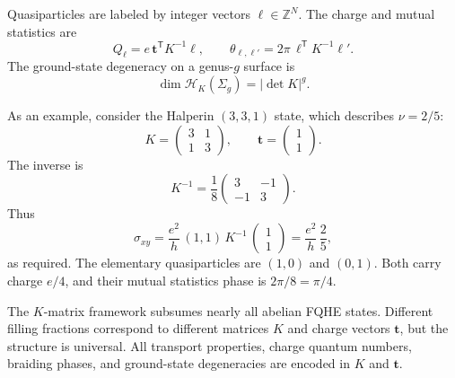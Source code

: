 Quasiparticles are labeled by integer vectors $\boldsymbol{\ell}\in\mathbb{Z}^N$. The charge and mutual statistics are
\begin{equation}
  Q_{\boldsymbol{\ell}}
  =
  e\,\mathbf{t}^{\mathsf{T}}K^{-1}\boldsymbol{\ell},
  \qquad
  \theta_{\boldsymbol{\ell},\boldsymbol{\ell}'}
  =
  2\pi\,\boldsymbol{\ell}^{\mathsf{T}}K^{-1}\boldsymbol{\ell}'.
  \label{eq:fqhe-k-charge-statistics}
\end{equation}
The ground-state degeneracy on a genus-$g$ surface is
\begin{equation}
  \dim\mathcal{H}_K(\Sigma_g) = |\det K|^g.
  \label{eq:fqhe-k-degeneracy}
\end{equation}

As an example, consider the Halperin $(3,3,1)$ state, which describes $\nu=2/5$:
\begin{equation}
  K = \begin{pmatrix} 3 & 1 \\ 1 & 3 \end{pmatrix},
  \qquad
  \mathbf{t} = \begin{pmatrix} 1 \\ 1 \end{pmatrix}.
  \label{eq:fqhe-halperin}
\end{equation}
The inverse is
\begin{equation}
  K^{-1} = \frac{1}{8}\begin{pmatrix} 3 & -1 \\ -1 & 3 \end{pmatrix}.
  \label{eq:fqhe-halperin-inverse}
\end{equation}
Thus
\begin{equation}
  \sigma_{xy} = \frac{e^2}{h}\,(1,1)\,K^{-1}\,\begin{pmatrix}1\\1\end{pmatrix}
  = \frac{e^2}{h}\,\frac{2}{5},
  \label{eq:fqhe-halperin-conductivity}
\end{equation}
as required. The elementary quasiparticles are $(1,0)$ and $(0,1)$. Both carry charge $e/4$, and their mutual statistics phase is $2\pi/8=\pi/4$.

The $K$-matrix framework subsumes nearly all abelian FQHE states. Different filling fractions correspond to different matrices $K$ and charge vectors $\mathbf{t}$, but the structure is universal. All transport properties, charge quantum numbers, braiding phases, and ground-state degeneracies are encoded in $K$ and $\mathbf{t}$.

